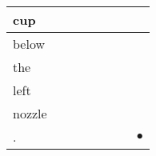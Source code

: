 \documentclass[landscape]{article}
\newcommand{\ssp}{\hspace{2pt}}
\newcommand{\mex}{\cellcolor{g}$\bullet$}
\begin{document}
\begin{tabular}{|l|p{10pt}|p{10pt}|p{10pt}|p{10pt}|p{10pt}|p{10pt}|p{10pt}|}
\hline
\ssp cup \ssp&\hspace{2pt}&\hspace{2pt}&\hspace{2pt}&\hspace{2pt}&\hspace{2pt}&\hspace{2pt}&\hspace{2pt}\\
\hline
\ssp below \ssp&\hspace{2pt}&\hspace{2pt}&\hspace{2pt}&\hspace{2pt}&\hspace{2pt}&\hspace{2pt}&\hspace{2pt}\\
\hline
\ssp the \ssp&\hspace{2pt}&\hspace{2pt}&\hspace{2pt}&\hspace{2pt}&\hspace{2pt}&\hspace{2pt}&\hspace{2pt}\\
\hline
\ssp left \ssp&\hspace{2pt}&\hspace{2pt}&\hspace{2pt}&\hspace{2pt}&\hspace{2pt}&\hspace{2pt}&\hspace{2pt}\\
\hline
\ssp nozzle \ssp&\hspace{2pt}&\hspace{2pt}&\hspace{2pt}&\hspace{2pt}&\hspace{2pt}&\hspace{2pt}&\hspace{2pt}\\
\hline
\ssp \cellcolor{ref6}. \ssp&\hspace{2pt}&\hspace{2pt}&\hspace{2pt}&\hspace{2pt}&\hspace{2pt}&\hspace{2pt}&\hspace{2pt}\mex\\
\hline
\end{tabular}
\end{document}
